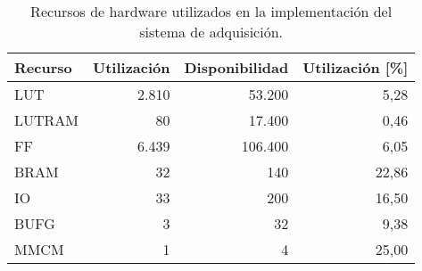 	\begin{table}[]
		\centering
		\caption{Recursos de hardware utilizados en la implementación del sistema de adquisición.}
		\label{tab:resources}
		\begin{tabular}{lrrr}
			\hline
			\textbf{Recurso} & \multicolumn{1}{l}{\textbf{Utilización}} & \multicolumn{1}{l}{\textbf{Disponibilidad}} & \multicolumn{1}{l}{\textbf{Utilización {[}\%{]}}} \\ \hline
			LUT    & 2.810 & 53.200  & 5,28  \\
			LUTRAM & 80    & 17.400  & 0,46  \\
			FF     & 6.439 & 106.400 & 6,05  \\
			BRAM   & 32    & 140     & 22,86 \\
			IO     & 33    & 200     & 16,50 \\
			BUFG   & 3     & 32      & 9,38  \\
			MMCM   & 1     & 4       & 25,00   
		\end{tabular}
	\end{table}